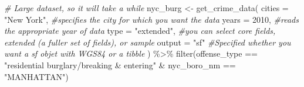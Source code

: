 \documentclass[
  krantz2]{krantz}
\makeatletter
\newenvironment{Shaded}{\begin{snugshade}}{\end{snugshade}}
\newcommand{\AttributeTok}[1]{\textcolor[rgb]{0.61,0.61,0.61}{#1}}
\newcommand{\CommentTok}[1]{\textcolor[rgb]{0.37,0.37,0.37}{\textit{#1}}}
\newcommand{\DecValTok}[1]{\textcolor[rgb]{0.06,0.06,0.06}{#1}}
\newcommand{\FunctionTok}[1]{\textcolor[rgb]{0,0,0}{#1}}
\newcommand{\NormalTok}[1]{#1}
\newcommand{\OtherTok}[1]{\textcolor[rgb]{0.37,0.37,0.37}{#1}}
\newcommand{\SpecialCharTok}[1]{\textcolor[rgb]{0,0,0}{#1}}
\newcommand{\StringTok}[1]{\textcolor[rgb]{0.5,0.5,0.5}{#1}}
\newenvironment{kframe}{%
\medskip{}
\setlength{\fboxsep}{.8em}
 \def\at@end@of@kframe{}%
 \ifinner\ifhmode%
  \def\at@end@of@kframe{\end{minipage}}%
  \begin{minipage}{\columnwidth}%
 \fi\fi%
 \def\FrameCommand##1{\hskip\@totalleftmargin \hskip-\fboxsep
 \colorbox{shadecolor}{##1}\hskip-\fboxsep
     \hskip-\linewidth \hskip-\@totalleftmargin \hskip\columnwidth}%
 \MakeFramed {\advance\hsize-\width
   \@totalleftmargin\z@ \linewidth\hsize
   \@setminipage}}%
 {\par\unskip\endMakeFramed%
 \at@end@of@kframe}
\renewenvironment{Shaded}{\begin{kframe}}{\end{kframe}}
\makeatother
\begin{document}
\begin{Shaded}
\begin{Highlighting}[]
\CommentTok{\# Large dataset, so it will take a while}
\NormalTok{nyc\_burg }\OtherTok{\textless{}{-}} \FunctionTok{get\_crime\_data}\NormalTok{(}
  \AttributeTok{cities =} \StringTok{"New York"}\NormalTok{, }\CommentTok{\#specifies the city for which you want the data}
  \AttributeTok{years =} \DecValTok{2010}\NormalTok{,        }\CommentTok{\#reads the appropriate year of data}
  \AttributeTok{type =} \StringTok{"extended"}\NormalTok{,   }\CommentTok{\#you can select core fields, extended (a fuller set of                          fields), or sample}
  \AttributeTok{output =} \StringTok{"sf"}        \CommentTok{\#Specified whether you want a sf objet with WGS84 or a                          tibble}
\NormalTok{) }\SpecialCharTok{\%\textgreater{}\%}
  \FunctionTok{filter}\NormalTok{(offense\_type }\SpecialCharTok{==} \StringTok{"residential burglary/breaking \& entering"} \SpecialCharTok{\&}
\NormalTok{           nyc\_boro\_nm }\SpecialCharTok{==} \StringTok{"MANHATTAN"}\NormalTok{)}
\end{Highlighting}
\end{Shaded}
\end{document}
